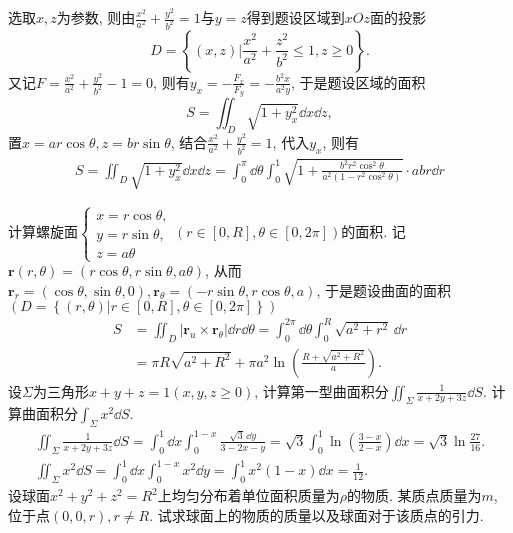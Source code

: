 \begin{quiza}
\begin{solution}
\tcbline
选取\(x,z\)为参数, 则由\(\frac{x^2}{a^2}+\frac{y^2}{b^2}=1\)与\(y=z\)得到题设区域到\(xOz\)面的投影\[D=\left\lbrace(x,z)\Big| \frac{x^2}{a^2}+\frac{z^2}{b^2}\leqslant  1,z\geqslant 0 \right\rbrace .\]又记\(F=\frac{x^2}{a^2}+\frac{y^2}{b^2}-1=0\), 则有\(y_x=-\frac{F_x}{F_y}=-\frac{b^2x}{a^2y}\), 于是题设区域的面积\[S=\iint_D\sqrt{1+y_x^2}\dd x\dd z,\]置\(x=ar\cos\theta,z=br\sin\theta\), 结合\(\frac{x^2}{a^2}+\frac{y^2}{b^2}=1\), 代入\(y_x\), 则有\[\begin{split}
S=\iint_D\sqrt{1+y_x^2}\dd x\dd z=\int_{0}^{\pi}\dd\theta\int_{0}^{1}\sqrt{1+\frac{b^2r^2\cos^2\theta}{a^2\left(1-r^2\cos^2\theta\right)}}\cdot abr\dd r
\end{split}\]
\end{solution}
\woe 计算螺旋面\(\begin{cases}
x=r\cos\theta,\\y=r\sin\theta,\\z=a\theta
\end{cases}\left(r\in[0,R],\theta\in[0,2\pi]\right)\)的面积.
\tcbline
记\(\boldsymbol{r}(r,\theta)=\left(r\cos\theta,r\sin\theta,a\theta\right)\), 从而\(\boldsymbol{r}_r=\left(\cos\theta,\sin\theta,0\right),\boldsymbol{r}_{\theta}=\left(-r\sin\theta,r\cos\theta,a\right)\), 于是题设曲面的面积\(\left(D=\left\lbrace(r,\theta)\big|r\in[0,R],\theta\in[0,2\pi]\right\rbrace\right)\)\[\begin{split}
S&=\iint_{D}\left|\boldsymbol{r}_u\times\boldsymbol{r}_{\theta}\right|\dd r\dd\theta=\int_{0}^{2\pi}\dd\theta\int_{0}^{R}\sqrt{a^2+r^2}\,\dd r\\&=\pi R\sqrt{a^2+R^2}+\pi a^2\ln\left(\frac{R+\sqrt{a^2+R^2}}{a}\right).
\end{split}\]
\tcbline 
\woe 设\(\varSigma\)为三角形\(x+y+z=1(x,y,z\geqslant 0)\), 计算第一型曲面积分\(\iint_{\varSigma}\frac{1}{x+2y+3z}\dd S\). 计算曲面积分\(\int_{\varSigma}x^2\dd S\).
\tcbline
\begin{gather*}
\iint_{\varSigma}\frac{1}{x+2y+3z}\dd S=\int_{0}^{1}\dd x\int_{0}^{1-x}\frac{\sqrt{3}\,\dd y}{3-2x-y}=\sqrt{3}\int_{0}^{1}\ln\left(\frac{3-x}{2-x}\right)\dd x=\sqrt{3}\ln\frac{27}{16}.\\
\iint_{\varSigma}x^2\dd S=\int_{0}^{1}\dd x\int_{0}^{1-x}x^2\dd y=\int_{0}^{1}x^2(1-x)\dd x=\frac{1}{12}.
\end{gather*}
\tcbline
\woe 设球面\(x^2+y^2+z^2=R^2\)上均匀分布着单位面积质量为\(\rho\)的物质. 某质点质量为\(m\), 位于点\((0,0,r),r\ne R\). 试求球面上的物质的质量以及球面对于该质点的引力.
\begin{solution}


\end{solution}
\end{quiza}
